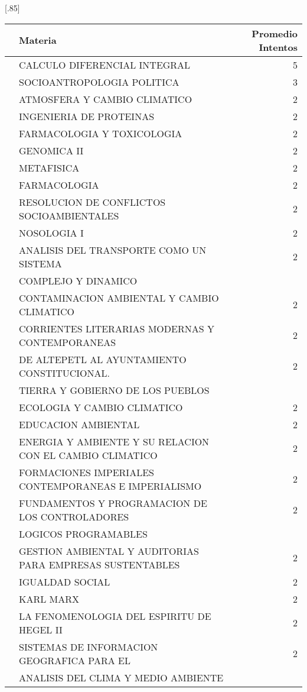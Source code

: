 \documentclass[12pt]{article}
\begin{document}
\begin{table}[ht]
\centering
\scalebox{0.75}[.85]{
\begin{tabular}{rlr}
  \hline
 & Materia & Promedio Intentos \\ 
  \hline
 & CALCULO DIFERENCIAL INTEGRAL & 5 \\ 
 & SOCIOANTROPOLOGIA POLITICA & 3 \\ 
 & ATMOSFERA Y CAMBIO CLIMATICO & 2 \\ 
 & INGENIERIA DE PROTEINAS & 2 \\ 
 & FARMACOLOGIA Y TOXICOLOGIA & 2 \\ 
 & GENOMICA II & 2 \\ 
 & METAFISICA & 2 \\ 
 & FARMACOLOGIA & 2 \\ 
 & RESOLUCION DE CONFLICTOS SOCIOAMBIENTALES & 2 \\ 
 & NOSOLOGIA I & 2 \\ 
 & ANALISIS DEL TRANSPORTE COMO UN SISTEMA & 2 \\ 
 & COMPLEJO Y DINAMICO &  \\ 
 & CONTAMINACION AMBIENTAL Y CAMBIO CLIMATICO & 2 \\ 
 & CORRIENTES LITERARIAS MODERNAS Y CONTEMPORANEAS & 2 \\ 
 & DE ALTEPETL AL AYUNTAMIENTO CONSTITUCIONAL. & 2 \\ 
 & TIERRA Y GOBIERNO DE LOS PUEBLOS &  \\ 
 & ECOLOGIA Y CAMBIO CLIMATICO & 2 \\ 
 & EDUCACION AMBIENTAL & 2 \\ 
 & ENERGIA Y AMBIENTE Y SU RELACION CON EL CAMBIO CLIMATICO & 2 \\ 
 & FORMACIONES IMPERIALES CONTEMPORANEAS E IMPERIALISMO & 2 \\ 
 & FUNDAMENTOS Y PROGRAMACION DE LOS CONTROLADORES & 2 \\ 
 & LOGICOS PROGRAMABLES &  \\ 
 & GESTION AMBIENTAL Y AUDITORIAS PARA EMPRESAS SUSTENTABLES & 2 \\ 
 & IGUALDAD SOCIAL & 2 \\ 
 & KARL MARX & 2 \\ 
 & LA FENOMENOLOGIA DEL ESPIRITU DE HEGEL II & 2 \\ 
 & SISTEMAS DE INFORMACION GEOGRAFICA PARA EL & 2 \\ 
 & ANALISIS DEL CLIMA Y MEDIO AMBIENTE &  \\ 
   \hline
\end{tabular}}
\end{table}
\end{document}
